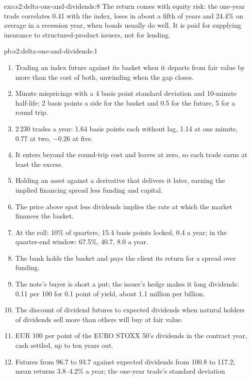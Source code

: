 \begin{solution}{exo:s2:delta-one-and-dividends:8}
The return comes with equity risk: the one-year trade correlates 0.41 with the index, loses in about a fifth of years and 24.4\% on average in a
recession year, when bonds usually do well. It is paid for supplying insurance to structured-product issuers, not for lending.
\end{solution}

\begin{solution}{pb:s2:delta-one-and-dividends:1}
\begin{enumerate}
\item Trading an index future against its basket when it departs from fair value by more than the cost of both, unwinding when the gap closes.
\item Minute mispricings with a 4 basis point standard deviation and 10-minute half-life; 2 basis points a side for the basket and 0.5 for the
future, 5 for a round trip.
\item 2\,230 trades a year: 1.64 basis points each without lag, 1.14 at one minute, 0.77 at two, $-0.26$ at five.
\item It enters beyond the round-trip cost and leaves at zero, so each trade earns at least the excess.
\item Holding an asset against a derivative that delivers it later, earning the implied financing spread less funding and capital.
\item The price above spot less dividends implies the rate at which the market finances the basket.
\item At the roll: 10\% of quarters, 15.4 basis points locked, 0.4 a year; in the quarter-end window: 67.5\%, 40.7, 8.0 a year.
\item The bank holds the basket and pays the client its return for a spread over funding.
\item The note's buyer is short a put; the issuer's hedge makes it long dividends: 0.11 per 100 for 0.1 point of yield, about 1.1 million per billion.
\item The discount of dividend futures to expected dividends when natural holders of dividends sell more than others will buy at fair value.
\item EUR 100 per point of the EURO STOXX 50's dividends in the contract year, cash settled, up to ten years out.
\item Futures from 96.7 to 93.7 against expected dividends from 100.8 to 117.2; mean returns 3.8--4.2\% a year; the one-year trade's standard deviation

\end{enumerate}
\end{solution}
